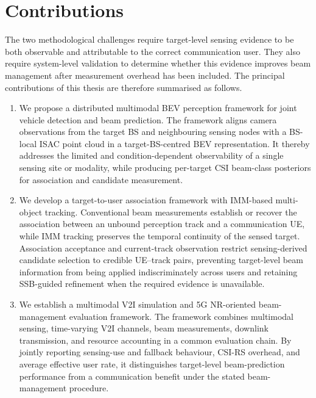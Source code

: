 \section{Contributions}
\label{sec:introduction-contributions}

The two methodological challenges require target-level sensing evidence to be
both observable and attributable to the correct communication user.  They also
require system-level validation to determine whether this evidence improves
beam management after measurement overhead has been included.  The principal
contributions of this thesis are therefore summarised as follows.

\begin{enumerate}
    \item We propose a distributed multimodal BEV perception framework for
    joint vehicle detection and beam prediction.  The framework aligns camera
    observations from the target BS and neighbouring sensing nodes with a
    BS-local ISAC point cloud in a target-BS-centred BEV representation.  It
    thereby addresses the limited and condition-dependent observability of a
    single sensing site or modality, while producing per-target CSI beam-class
    posteriors for association and candidate measurement.

    \item We develop a target-to-user association framework with IMM-based
    multi-object tracking.  Conventional beam measurements establish or recover
    the association between an unbound perception track and a communication UE,
    while IMM tracking preserves the temporal continuity of the sensed target.
    Association acceptance and current-track observation restrict
    sensing-derived candidate selection to credible UE--track pairs, preventing
    target-level beam information from being applied indiscriminately across
    users and retaining SSB-guided refinement when the required evidence is
    unavailable.

    \item We establish a multimodal V2I simulation and 5G NR-oriented
    beam-management evaluation framework.  The framework combines multimodal
    sensing, time-varying V2I channels, beam measurements, downlink transmission,
    and resource accounting in a common evaluation chain.  By jointly reporting
    sensing-use and fallback behaviour, CSI-RS overhead, and average effective
    user rate, it distinguishes
    target-level beam-prediction performance from a communication benefit under
    the stated beam-management procedure.
\end{enumerate}

